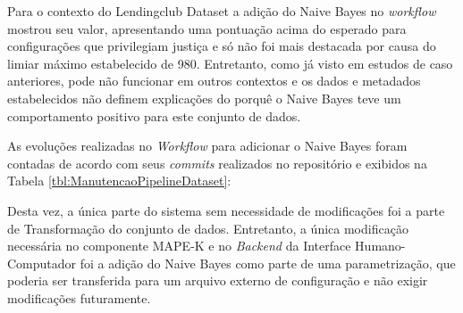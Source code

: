 \documentclass{article}
\begin{document}
Para o contexto do Lendingclub Dataset a adição do Naive Bayes no \textit{workflow} mostrou seu valor, apresentando uma pontuação acima do esperado para configurações que privilegiam justiça e só não foi mais destacada por causa do limiar máximo estabelecido de 980. Entretanto, como já visto em estudos de caso anteriores, pode não funcionar em outros contextos e os dados e metadados estabelecidos não definem explicações do porquê o Naive Bayes teve um comportamento positivo para este conjunto de dados.

As evoluções realizadas no \textit{Workflow} para adicionar o Naive Bayes foram contadas de acordo com seus \textit{commits} realizados no repositório e exibidos  na Tabela \ref{tbl:ManutencaoPipelineDataset}:

\begin{table}[H]
\begin{center}
  \caption{Quantidade de modificações realizadas ao adicionar um novo algoritmo ao \textit{Workflow}}
\label{tbl:ManutencaoPipelineCaso3}
\end{center}
\end{table}

Desta vez, a única parte do sistema sem necessidade de modificações foi a parte de Transformação do conjunto de dados. Entretanto, a única modificação necessária no componente MAPE-K e no \textit{Backend} da Interface Humano-Computador foi a adição do Naive Bayes como parte de uma parametrização, que poderia ser transferida para um arquivo externo de configuração e não exigir modificações futuramente.
\end{document}
